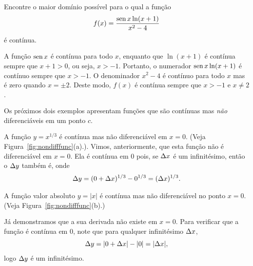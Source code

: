 \begin{example}
  Encontre o maior domínio possível para o qual a função
  $$
    f(x) = \frac{\operatorname{sen} x \ln(x + 1)}{x^2 - 4}
  $$
  é contínua.

  A função $\operatorname{sen} x$ é contínua para todo $x$, enquanto que $\ln(x + 1)$ é
  contínua sempre que $x + 1 > 0$, ou seja, $x > -1$. Portanto, o numerador
  $\operatorname{sen} x \ln(x + 1)$ é contínuo sempre que $x > -1$. O denominador $x^2-4$
  é contínuo para todo $x$ mas é zero quando $x = \pm 2$. Deste modo, $f(x)$
  é contínua sempre que $x > -1$ e $x \ne 2$.
\end{example}

Os próximos dois exemplos apresentam funções que são contínuas mas \emph{não}
diferenciáveis em um ponto $c$.

\begin{example}
  A função $y = x^{1/3}$ é contínua mas não diferenciável em $x = 0$.
  (Veja Figura~\ref{fig:nondifffunc}(a).). Vimos, anteriormente, que esta
  função não é diferenciável em $x = 0$. Ela é contínua em $0$ pois, se
  $\Delta x$ é um infinitésimo, então o $\Delta y$ também é, onde
  $$
    \Delta y = (0 + \Delta x)^{1/3} - 0^{1/3} = (\Delta x)^{1/3}.
  $$
\end{example}

\begin{example}
  A função valor absoluto $y = |x|$ é contínua mas não diferenciável no
  ponto $x = 0$. (Veja Figura~\ref{fig:nondifffunc}(b).)

  Já demonstramos que a sua derivada não existe em $x = 0$. Para verificar
  que a função é contínua em $0$, note que para qualquer infinitésimo $\Delta x$,
  $$
    \Delta y = |0 + \Delta x| - |0| = |\Delta x|,
  $$
  logo $\Delta y$ é um infinitésimo.
\end{example}

